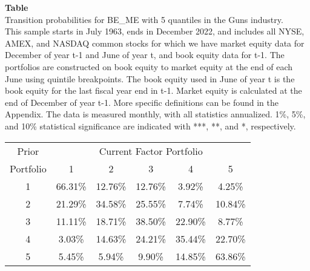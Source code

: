 \begin{table*}[ht!]
\raggedright
{}
\label{tab: transition_probs_BE_ME_Guns_with_5_quantiles}
\textbf{Table \thetable} \\
Transition probabilities for BE_ME with 5 quantiles in the Guns industry. \\
\hspace*{1em}This sample starts in July 1963, ends in December 2022, and includes all NYSE, AMEX, and NASDAQ common stocks for which we have market equity data for December of year t-1 and June of year t, and book equity data for t-1. The portfolios are constructed on book equity to market equity at the end of each June using quintile breakpoints.  The book equity used in June of year t is the book equity for the last fiscal year end in t-1.  Market equity is calculated at the end of December of year t-1.  More specific definitions can be found in the Appendix.  The data is measured monthly, with all statistics annualized.  1\%, 5\%, and 10\% statistical significance are indicated with ***, **, and *, respectively. \\
\vspace{0.5em}
\centering
\begin{adjustbox}{max width=\textwidth}
\begin{tabular}{@{}cccccc@{}}
\toprule
Prior & \multicolumn{5}{c}{Current Factor Portfolio} \\
Portfolio & 1 & 2 & 3 & 4 & 5 \\
\midrule
1 & 66.31\% & 12.76\% & 12.76\% & 3.92\% & 4.25\% \\
2 & 21.29\% & 34.58\% & 25.55\% & 7.74\% & 10.84\% \\
3 & 11.11\% & 18.71\% & 38.50\% & 22.90\% & 8.77\% \\
4 & 3.03\% & 14.63\% & 24.21\% & 35.44\% & 22.70\% \\
5 & 5.45\% & 5.94\% & 9.90\% & 14.85\% & 63.86\% \\
\bottomrule
\end{tabular}
\end{adjustbox}
\end{table*}